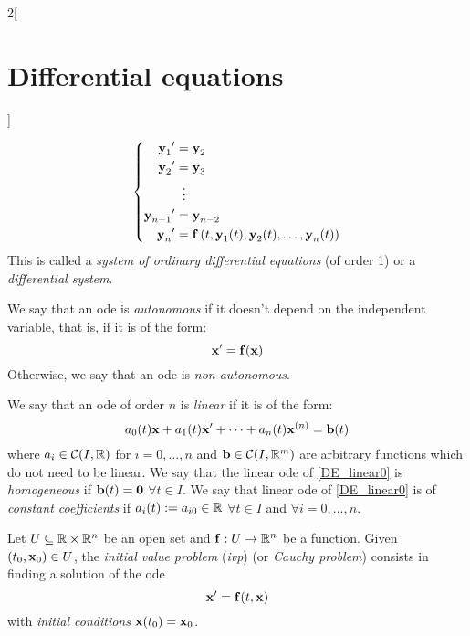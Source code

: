\documentclass[../../../main_math.tex]{subfiles}
\begin{document}
\begin{multicols}{2}[\section{Differential equations}]
\begin{proposition}
    \begin{equation*}
      \left\{
      \begin{aligned}
        {\boldsymbol{\mathrm{y}}_1}'     & =\boldsymbol{\mathrm{y}}_2                                                        \\
        {\boldsymbol{\mathrm{y}}_2}'     & =\boldsymbol{\mathrm{y}}_3                                                        \\
                        & \;\;\vdots                                                       \\
        {\boldsymbol{\mathrm{y}}_{n-1}}' & =\boldsymbol{\mathrm{y}}_{n-2}                                                    \\
        {\boldsymbol{\mathrm{y}}_n}'     & =\boldsymbol{\mathrm{f}}\left(t,\boldsymbol{\mathrm{y}}_1(t),\boldsymbol{\mathrm{y}}_2(t),\ldots,\boldsymbol{\mathrm{y}}_n(t)\right) \\
      \end{aligned}
      \right.
    \end{equation*}
    This is called a \emph{system of ordinary differential equations} (of order 1) or a \emph{differential system}.
  \end{proposition}
  \begin{definition}
    We say that an ode is \emph{autonomous} if it doesn't depend on the independent variable, that is, if it is of the form: $$\boldsymbol{\mathrm{x}}'=\boldsymbol{\mathrm{f}}(\boldsymbol{\mathrm{x}})$$ Otherwise, we say that an ode is \emph{non-autonomous}.
  \end{definition}
  \begin{definition}
    We say that an ode of order $n$ is \emph{linear} if it is of the form:
    \begin{equation}\label{DE_linear0}
      a_0(t)\boldsymbol{\mathrm{x}}+a_1(t)\boldsymbol{\mathrm{x}}'+\cdots+a_n(t)\boldsymbol{\mathrm{x}}^{(n)}=\boldsymbol{\mathrm{b}}(t)
    \end{equation}
    where $a_i\in\mathcal{C}(I,\mathbb{R})$ for $i=0,\ldots,n$ and $\boldsymbol{\mathrm{b}}\in\mathcal{C}(I,\mathbb{R}^m)$ are arbitrary functions which do not need to be linear. We say that the linear ode of \cref{DE_linear0} is \emph{homogeneous} if $\boldsymbol{\mathrm{b}}(t)=\boldsymbol{\mathrm{0}}$ $\forall t\in I$. We say that linear ode of \cref{DE_linear0} is of \emph{constant coefficients} if $a_i(t):=a_{i0}\in\mathbb{R}$ $\forall t\in I$ and $\forall i=0,\ldots,n$.
  \end{definition}
  \begin{definition}
    Let $U\subseteq\mathbb{R}\times\mathbb{R}^n$ be an open set and $\boldsymbol{\mathrm{f}}:U\rightarrow\mathbb{R}^n$ be a function. Given $(t_0,\boldsymbol{\mathrm{x}}_0)\in U$, the \emph{initial value problem} (\emph{ivp}) (or \emph{Cauchy problem}) consists in finding a solution of the ode $$\boldsymbol{\mathrm{x}}'=\boldsymbol{\mathrm{f}}(t,\boldsymbol{\mathrm{x}})$$ with \emph{initial conditions} $\boldsymbol{\mathrm{x}}(t_0)=\boldsymbol{\mathrm{x}}_0$.
  \end{definition}

\end{multicols}
\end{document}
